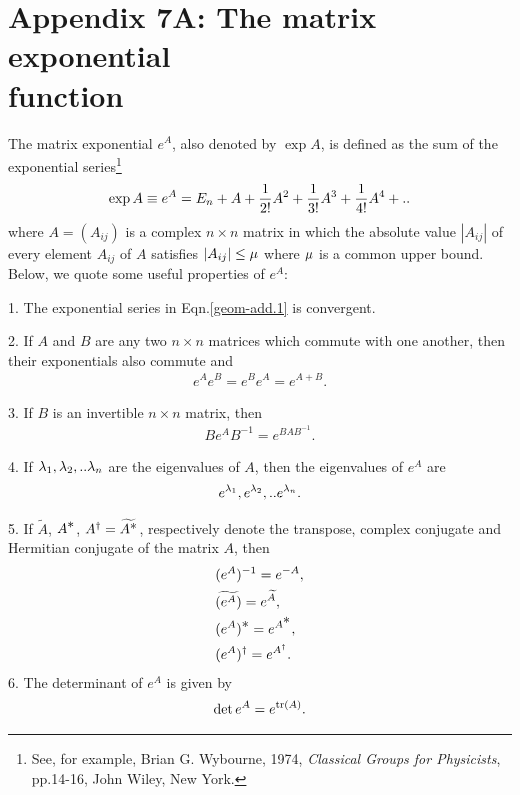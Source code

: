 {\section*{Appendix 7A: The matrix exponential\\   
function}
The matrix exponential $e^A$, also denoted by 
$\exp{A}$, is defined as the sum of the exponential 
series\footnote{See, for example, Brian G. Wybourne, 
1974, \textsl{Classical Groups for Physicists}, 
pp.14-16,  John Wiley, New York.}
\begin{align}\label{geom-add.1}
\exp{A}\equiv e^A=E_n+A+\frac{1}{2!}A^2+\frac{1}{3!}A^3
 +\frac{1}{4!}A^4+..
\end{align}
where $A=(A_{ij})$ is a complex  $n\times n$ matrix in 
which the absolute value $|A_{ij}|$ of {every} element 
$A_{ij}$ of $A$ satisfies $|A_{ij}|\leq {\mu}$ where 
${\mu}$ is a common upper bound. Below, we quote some 
useful properties of $e^A$:

1.  The exponential series in Eqn.\eqref{geom-add.1} is
convergent.

2.  If $A$ and $B$ are any two $n\times n$ matrices 
which commute with one another, then their 
exponentials 
also commute and
\begin{align} \label{geom-add.2}
 e^A e^B=e^B e^A=e^{A+B}.
\end{align}

3.  If $B$ is an invertible $n\times n$ matrix, then
\begin{align}  \label{geom-add.3}
 Be^A B^{-1}=e^{BAB^{-1}}.
\end{align}

4.  If  ${\lambda}_1,{\lambda}_2,.. {\lambda}_n$ are the eigenvalues 
of $A$, then the eigenvalues of $e^A$ are
\begin{align} \label{geom-add.4}
e^{{\lambda}_1},e^{{\lambda}_2},.. e^{{\lambda}_n}.
\end{align}

5.  If $\tilde{A}$, $A^{\textstyle \ast}$, 
$A^\dagger=\widetilde{A^{\textstyle \ast}}$,
respectively denote the transpose, complex conjugate 
and Hermitian conjugate of the matrix $A$, then
\begin{align} \label{geom-add.5}
& (e^A)^{-1}=e^{-A},\\\label{geom-add.5b}
& \widetilde{(e^A)}=e^{\widetilde{A}},\\
&(e^A)^{\textstyle \ast}=e^{A^{\textstyle \ast}},\\
&(e^A)^\dagger=e^{A^\dagger}.
\end{align}
6.  The determinant of $e^A$ is given by
\begin{align}  \label{geom-add.6}
\det {e^A}=e^{\text{tr}(A)}.
\end{align}
\ebx

}
